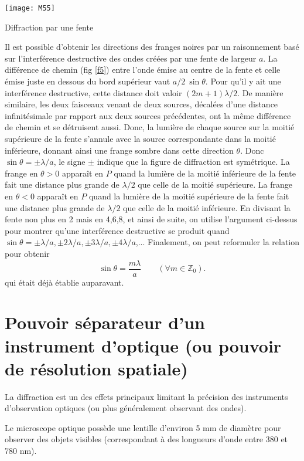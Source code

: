 \begin{marginfigure}[2cm]
\texttt{[image: M55]}
\caption{Diffraction par une fente}
\label{f5}
\end{marginfigure}

\noindent Il est possible d'obtenir les directions des franges noires par un raisonnement basé sur l'interférence destructive des ondes créées par une fente de largeur $a$. La différence de chemin (fig \ref{f5}) entre l'onde émise au centre de la fente et celle émise juste en dessous du bord supérieur vaut $a/2\:\sin\theta$. Pour qu'il y ait une interférence destructive, cette distance doit valoir $(2m+1)\lambda/2$. De manière similaire, les deux faisceaux venant de deux sources, décalées d'une distance infinitésimale par rapport aux deux sources précédentes, ont la même différence de chemin et se détruisent aussi. Donc, la lumière de chaque source sur la moitié supérieure de la fente s'annule avec la source correspondante dans la moitié inférieure, donnant ainsi une frange sombre dans cette direction $\theta$. Donc $\sin\theta=\pm\lambda/a$, le signe $\pm$ indique que la figure de diffraction est symétrique. La frange en $\theta>0$ apparaît en $P$ quand la lumière de la moitié inférieure de la fente fait une distance plus grande de $\lambda/2$ que celle de la moitié supérieure. La frange en $\theta<0$ apparaît en $P$ quand la lumière de la moitié supérieure de la fente fait une distance plus grande de $\lambda/2$ que celle de la moitié inférieure. En divisant la fente non plus en 2 mais en 4,6,8, et ainsi de suite, on utilise l'argument ci-dessus pour montrer qu'une interférence destructive se produit quand $\sin\theta=\pm\lambda/a,\pm2\lambda/a,\pm3\lambda/a,\pm4\lambda/a$,...
Finalement, on peut reformuler la relation pour obtenir
$$
    \sin\theta=\frac{m\lambda}{a}\qquad(\forall m\in  \mathbb{Z}_0).
$$
qui était déjà établie auparavant.

\section{Pouvoir séparateur d'un instrument d'optique (ou pouvoir de résolution spatiale) }

La diffraction est un des effets principaux limitant la précision des instruments d'observation optiques (ou plus généralement observant des ondes).

\noindent Le microscope optique possède une lentille d'environ 5 mm de diamètre pour observer des objets visibles (correspondant à des longueurs d'onde entre 380 et 780 nm).

